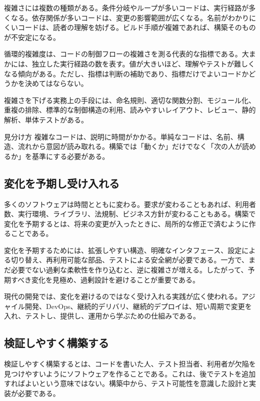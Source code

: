 \documentclass[a4paper,11pt,ja=standard,xelatex]{bxjsarticle}
\begin{document}
複雑さには複数の種類がある。条件分岐やループが多いコードは、実行経路が多くなる。依存関係が多いコードは、変更の影響範囲が広くなる。名前がわかりにくいコードは、読者の理解を妨げる。ビルド手順が複雑であれば、構築そのものが不安定になる。

循環的複雑度は、コードの制御フローの複雑さを測る代表的な指標である。大まかには、独立した実行経路の数を表す。値が大きいほど、理解やテストが難しくなる傾向がある。ただし、指標は判断の補助であり、指標だけでよいコードかどうかを決めてはならない。

複雑さを下げる実務上の手段には、命名規則、適切な関数分割、モジュール化、重複の排除、標準的な制御構造の利用、読みやすいレイアウト、レビュー、静的解析、単体テストがある。

\begin{keybox}{見分け方}
複雑なコードは、説明に時間がかかる。単純なコードは、名前、構造、流れから意図が読み取れる。構築では「動くか」だけでなく「次の人が読めるか」を基準にする必要がある。
\end{keybox}

\subsection{変化を予期し受け入れる}

多くのソフトウェアは時間とともに変わる。要求が変わることもあれば、利用者数、実行環境、ライブラリ、法規制、ビジネス方針が変わることもある。構築で変化を予期するとは、将来の変更が入ったときに、局所的な修正で済むように作ることである。

変化を予期するためには、拡張しやすい構造、明確なインタフェース、設定による切り替え、再利用可能な部品、テストによる安全網が必要である。一方で、まだ必要でない過剰な柔軟性を作り込むと、逆に複雑さが増える。したがって、予期すべき変化を見極め、過剰設計を避けることが重要である。

現代の開発では、変化を避けるのではなく受け入れる実践が広く使われる。アジャイル開発、DevOps、継続的デリバリ、継続的デプロイは、短い周期で変更を入れ、テストし、提供し、運用から学ぶための仕組みである。

\subsection{検証しやすく構築する}

検証しやすく構築するとは、コードを書いた人、テスト担当者、利用者が欠陥を見つけやすいようにソフトウェアを作ることである。これは、後でテストを追加すればよいという意味ではない。構築中から、テスト可能性を意識した設計と実装が必要である。
\end{document}
